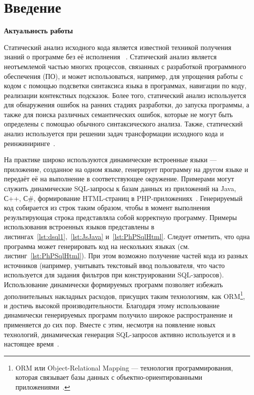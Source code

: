 \chapter*{Введение}                         %
\textbf{Актуальность работы}

Статический анализ исходного кода является известной техникой  получения знаний о программе без её исполнения ~\cite{StaticCodeAnalysis3,StaticCodeAnalysis2,StaticCodeAnalysis1}. Статический анализ является неотъемлемой частью многих процессов, связанных с разработкой программного обеспечения (ПО), и может использоваться, например, для упрощения работы с кодом с помощью подсветки синтаксиса языка в программах, навигации по коду, реализации контекстных подсказок. Более того, статический анализ используется для обнаружения ошибок на ранних стадиях разработки, до запуска программы, а также для поиска различных семантических ошибок, которые не могут быть определены с помощью обычного синтаксического анализа.  Также, статический анализ используется при решении задач трансформации исходного кода и реинжиниринге~\cite{reengANT}.

На практике широко используются динамические встроенные языки --- приложение, созданное на одном языке, генерирует программу на другом языке и передаёт её на выполнение в соответствующее окружение. Примерами могут служить динамические SQL-запросы к базам данных из приложений на Java, С++, С\#, формирование HTML-страниц в PHP-приложениях~\cite{DSQLISO,JSP,PHPmySQL}. Генерируемый код собирается из строк таким образом, чтобы в момент выполнения результирующая строка представляла собой корректную программу. Примеры использования встроенных языков представлены в листингах~\ref{lst:dsql1},~\ref{lst:JsJava} и~\ref{lst:PhPSqlHtml}. Следует отметить, что одна программа может генерировать код на нескольких языках (см. листинг~\ref{lst:PhPSqlHtml}). При этом возможно получение частей кода из разных источников (например, учитывать текстовый ввод пользователя, что часто используется для задания фильтров при конструировании SQL-запросов). Использование динамически формируемых программ  позволяет избежать дополнительных накладных расходов, присущих таким технологиям, как ORM\footnote{ORM или Object-Relational Mapping --- технология программирования, которая связывает базы данных с объектно-ориентированными приложениями~\cite{ORM}.}, и достичь высокой производительности. Благодаря этому использование динамически генерируемых программ получило широкое распространение и применяется до сих пор. Вместе с этим, несмотря на появление новых технологий, динамическая генерация SQL-запросов активно используется и в настоящее время~\cite{DSQLInActiveUse}.

